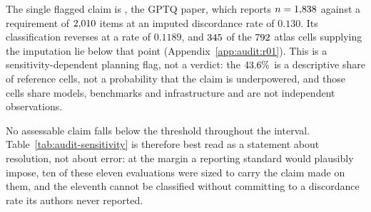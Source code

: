 The single flagged claim is \AuditSensitiveClaim{}, the GPTQ paper, which
reports $n = 1{,}838{}$ against a requirement of
$2{,}010{}$ items at an imputed discordance rate of $0.130$. Its
classification reverses at a rate of $0.1189$, and
$345{}$ of the $792{}$ atlas cells
supplying the imputation lie below that point
(Appendix~\ref{app:audit:r01}). This is a sensitivity-dependent planning flag,
not a verdict: the $43.6{}\%$ is a descriptive share of
reference cells, not a probability that the claim is underpowered, and those
cells share models, benchmarks and infrastructure and are not independent
observations.

No assessable claim falls below the threshold throughout the interval.
Table~\ref{tab:audit-sensitivity} is therefore best read as a statement about
resolution, not about error: at the margin a reporting standard would plausibly
impose, ten of these eleven evaluations were sized to carry the claim made on
them, and the eleventh cannot be classified without committing to a discordance
rate its authors never reported.

